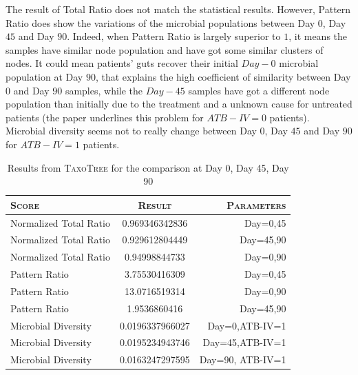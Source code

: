 \documentclass{report}
\begin{document}
The result of Total Ratio does not match the statistical results. However, Pattern Ratio does show the variations of the microbial populations between Day $0$, Day $45$ and Day $90$. Indeed, when Pattern Ratio is largely superior to $1$, it means the samples have similar node population and have got some similar clusters of nodes. It could mean patients' guts recover their initial $Day-0$ microbial population at Day $90$, that explains the high coefficient of similarity between Day $0$ and Day $90$ samples, while the $Day-45$ samples have got a different node population than initially due to the treatment and a unknown cause for untreated patients (the paper underlines this problem for $ATB-IV = 0$ patients). Microbial diversity seems not to really change between Day $0$, Day $45$ and Day $90$ for $ATB-IV = 1$ patients.

     \begin{table}
       \caption{Results from \textsc{TaxoTree} for the comparison at Day 0, Day 45, Day 90}
       \begin{tabular}{|l|c|r|}
         \hline
         \textsc{Score} & \textsc{Result} & \textsc{Parameters}\\
         \hline
         Normalized Total Ratio & 0.969346342836 & Day=0,45\\
         \hline
         Normalized Total Ratio & 0.929612804449 & Day=45,90\\
         \hline
         Normalized Total Ratio & 0.94998844733 & Day=0,90\\
         \hline
         Pattern Ratio & 3.75530416309 & Day=0,45 \\
         \hline
         Pattern Ratio & 13.0716519314 & Day=0,90 \\
         \hline
         Pattern Ratio & 1.9536860416 & Day=45,90 \\
         \hline
         Microbial Diversity & 0.0196337966027 & Day=0,ATB-IV=1 \\
         \hline
         Microbial Diversity & 0.0195234943746 & Day=45,ATB-IV=1 \\
         \hline
         Microbial Diversity & 0.0163247297595 & Day=90, ATB-IV=1\\
         \hline
       \end{tabular}
     \end{table}
\end{document}
